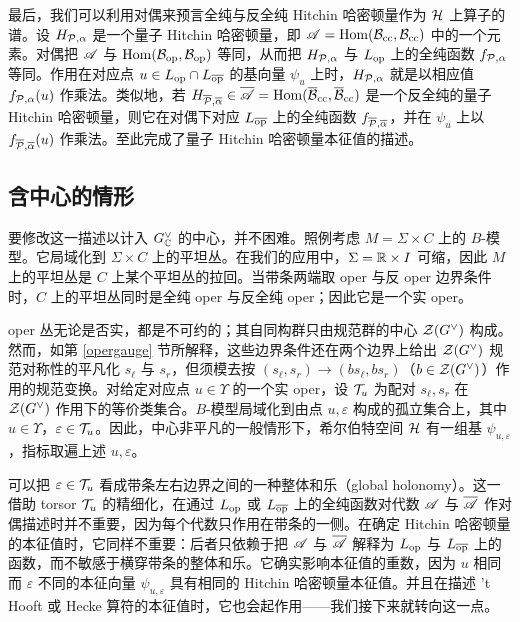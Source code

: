 最后，我们可以利用对偶来预言全纯与反全纯 Hitchin 哈密顿量作为 $\H$ 上算子的谱。设 $H_{\P,\alpha}$ 是一个量子 Hitchin 哈密顿量，即 $\A=\Hom(\B_\cc,\B_\cc)$ 中的一个元素。对偶把 $\A$ 与 $\Hom(\B_\op,\B_\op)$ 等同，从而把 $H_{\P,\alpha}$ 与 $L_\op$ 上的全纯函数 $f_{\P,\alpha}$ 等同。作用在对应点 $u\in L_\op\cap L_\bop$ 的基向量 $\psi_u$ 上时，$H_{\P,\alpha}$ 就是以相应值 $f_{\P,\alpha}(u)$ 作乘法。类似地，若 $H_{\b\P,\b\alpha}\in \b\A=\Hom(\b\B_\cc,\b\B_\cc)$ 是一个反全纯的量子 Hitchin 哈密顿量，则它在对偶下对应 $L_\bop$ 上的全纯函数 $f_{\bar\P,\b\alpha}$，并在 $\psi_u$ 上以 $f_{\b\P,\b\alpha}(u)$ 作乘法。至此完成了量子 Hitchin 哈密顿量本征值的描述。

\subsection{含中心的情形}\label{inccenter}

要修改这一描述以计入 $G_\C^\vee$ 的中心，并不困难。照例考虑 $M=\Sigma\times C$ 上的 $B$-模型。它局域化到 $\Sigma\times C$ 上的平坦丛。在我们的应用中，$\Sigma=\R\times I$ 可缩，因此 $M$ 上的平坦丛是 $C$ 上某个平坦丛的拉回。当带条两端取 oper 与反 oper 边界条件时，$C$ 上的平坦丛同时是全纯 oper 与反全纯 oper；因此它是一个实 oper。

oper 丛无论是否实，都是不可约的；其自同构群只由规范群的中心 $\zZ(G^\vee)$ 构成。然而，如第 \ref{opergauge} 节所解释，这些边界条件还在两个边界上给出 $\zZ(G^\vee)$ 规范对称性的平凡化 $s_\ell$ 与 $s_r$，但须模去按 $(s_\ell, s_r)\to (b s_\ell,b s_r)$（$b\in \zZ(G^\vee)$）作用的规范变换。对给定对应点 $u\in \Upsilon$ 的一个实 oper，设 $\T_u$ 为配对 $s_\ell,s_r$ 在 $\zZ(G^\vee)$ 作用下的等价类集合。$B$-模型局域化到由点 $u,\varepsilon$ 构成的孤立集合上，其中 $u\in \Upsilon$，$\varepsilon\in \T_u$。因此，中心非平凡的一般情形下，希尔伯特空间 $\H$ 有一组基 $\psi_{u,\varepsilon}$，指标取遍上述 $u,\varepsilon$。

可以把 $\varepsilon\in\T_u$ 看成带条左右边界之间的一种整体和乐（global holonomy）。这一借助 torsor $\T_u$ 的精细化，在通过 $L_\op$ 或 $L_\bop$ 上的全纯函数对代数 $\A$ 与 $\bA$ 作对偶描述时并不重要，因为每个代数只作用在带条的一侧。在确定 Hitchin 哈密顿量的本征值时，它同样不重要：后者只依赖于把 $\A$ 与 $\bA$ 解释为 $L_\op$ 与 $L_\bop$ 上的函数，而不敏感于横穿带条的整体和乐。它确实影响本征值的重数，因为 $u$ 相同而 $\varepsilon$ 不同的本征向量 $\psi_{u,\varepsilon}$ 具有相同的 Hitchin 哈密顿量本征值。并且在描述 't Hooft 或 Hecke 算符的本征值时，它也会起作用——我们接下来就转向这一点。
